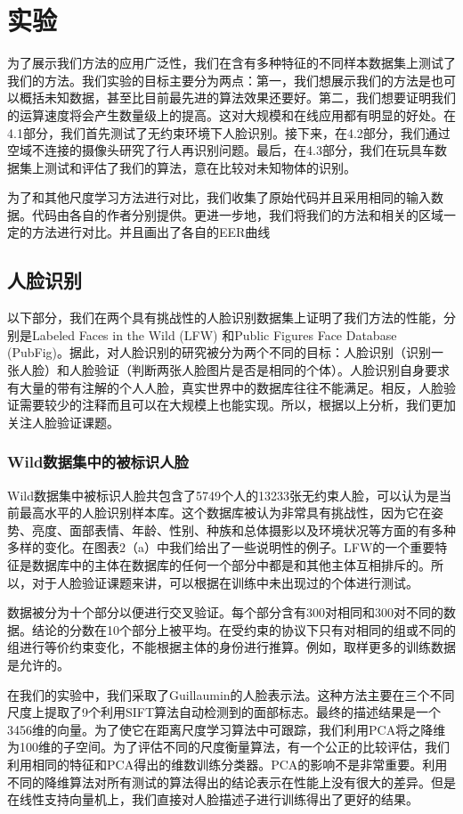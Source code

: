 \section{实验}
为了展示我们方法的应用广泛性，我们在含有多种特征的不同样本数据集上测试了我们的方法。我们实验的目标主要分为两点：第一，我们想展示我们的方法是也可以概括未知数据，甚至比目前最先进的算法效果还要好。第二，我们想要证明我们的运算速度将会产生数量级上的提高。这对大规模和在线应用都有明显的好处。在4.1部分，我们首先测试了无约束环境下人脸识别。接下来，在4.2部分，我们通过空域不连接的摄像头研究了行人再识别问题。最后，在4.3部分，我们在玩具车数据集上测试和评估了我们的算法，意在比较对未知物体的识别。

为了和其他尺度学习方法进行对比，我们收集了原始代码并且采用相同的输入数据。代码由各自的作者分别提供。更进一步地，我们将我们的方法和相关的区域一定的方法进行对比。并且画出了各自的EER曲线
\subsection{人脸识别}
以下部分，我们在两个具有挑战性的人脸识别数据集上证明了我们方法的性能，分别是Labeled Faces in the Wild (LFW) 和Public Figures Face Database (PubFig)。据此，对人脸识别的研究被分为两个不同的目标：人脸识别（识别一张人脸）和人脸验证（判断两张人脸图片是否是相同的个体）。人脸识别自身要求有大量的带有注解的个人人脸，真实世界中的数据库往往不能满足。相反，人脸验证需要较少的注释而且可以在大规模上也能实现。所以，根据以上分析，我们更加关注人脸验证课题。

\subsubsection{Wild数据集中的被标识人脸}
Wild数据集中被标识人脸共包含了5749个人的13233张无约束人脸，可以认为是当前最高水平的人脸识别样本库。这个数据库被认为非常具有挑战性，因为它在姿势、亮度、面部表情、年龄、性别、种族和总体摄影以及环境状况等方面的有多种多样的变化。在图表2（a）中我们给出了一些说明性的例子。LFW的一个重要特征是数据库中的主体在数据库的任何一个部分中都是和其他主体互相排斥的。所以，对于人脸验证课题来讲，可以根据在训练中未出现过的个体进行测试。

数据被分为十个部分以便进行交叉验证。每个部分含有300对相同和300对不同的数据。结论的分数在10个部分上被平均。在受约束的协议下只有对相同的组或不同的组进行等价约束变化，不能根据主体的身份进行推算。例如，取样更多的训练数据是允许的。

在我们的实验中，我们采取了Guillaumin的人脸表示法。这种方法主要在三个不同尺度上提取了9个利用SIFT算法自动检测到的面部标志。最终的描述结果是一个3456维的向量。为了使它在距离尺度学习算法中可跟踪，我们利用PCA将之降维为100维的子空间。为了评估不同的尺度衡量算法，有一个公正的比较评估，我们利用相同的特征和PCA得出的维数训练分类器。PCA的影响不是非常重要。利用不同的降维算法对所有测试的算法得出的结论表示在性能上没有很大的差异。但是在线性支持向量机上，我们直接对人脸描述子进行训练得出了更好的结果。

